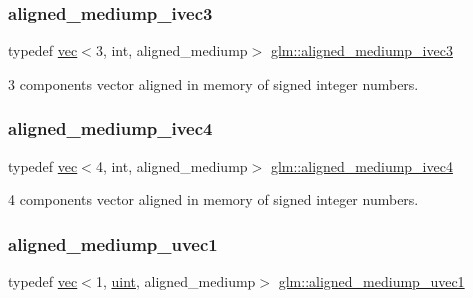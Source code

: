 \subsubsection{\texorpdfstring{aligned\+\_\+mediump\+\_\+ivec3}{aligned\_mediump\_ivec3}}
{\footnotesize\ttfamily typedef \hyperlink{structglm_1_1vec}{vec}$<$3, int, aligned\+\_\+mediump$>$ \hyperlink{group__gtc__type__aligned_gad835ac79ecdcae8d6292b37656f54973}{glm\+::aligned\+\_\+mediump\+\_\+ivec3}}



3 components vector aligned in memory of signed integer numbers. 

\mbox{\label{group__gtc__type__aligned_ga6960abdd6dda1c21b99d28894414ff67}} 
\subsubsection{\texorpdfstring{aligned\+\_\+mediump\+\_\+ivec4}{aligned\_mediump\_ivec4}}
{\footnotesize\ttfamily typedef \hyperlink{structglm_1_1vec}{vec}$<$4, int, aligned\+\_\+mediump$>$ \hyperlink{group__gtc__type__aligned_ga6960abdd6dda1c21b99d28894414ff67}{glm\+::aligned\+\_\+mediump\+\_\+ivec4}}



4 components vector aligned in memory of signed integer numbers. 

\mbox{\label{group__gtc__type__aligned_ga7988ca1255907c807b71cb09a7cb590a}} 
\subsubsection{\texorpdfstring{aligned\+\_\+mediump\+\_\+uvec1}{aligned\_mediump\_uvec1}}
{\footnotesize\ttfamily typedef \hyperlink{structglm_1_1vec}{vec}$<$1, \hyperlink{group__core__precision_ga4fd29415871152bfb5abd588334147c8}{uint}, aligned\+\_\+mediump$>$ \hyperlink{group__gtc__type__aligned_ga7988ca1255907c807b71cb09a7cb590a}{glm\+::aligned\+\_\+mediump\+\_\+uvec1}}




